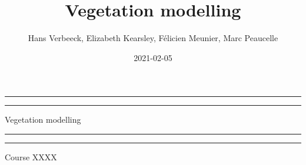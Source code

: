 \documentclass[
  oneside]{book}
\title{Vegetation modelling}
\author{Hans Verbeeck, Elizabeth Kearsley, Félicien Meunier, Marc Peaucelle}
\date{2021-02-05}
\begin{document}
\maketitle

\newcommand{\plogo}{\fbox{$\mathcal{PL}$}} %
\frontmatter


\begin{titlepage} %

	\centering %
	
	\scshape %
	
	\vspace*{\baselineskip} %
	
	
	\vspace{12\baselineskip}
	
	\rule{\textwidth}{1.6pt}\vspace*{-\baselineskip}\vspace*{2pt} %
	\rule{\textwidth}{0.4pt} %
	
	\vspace{0.75\baselineskip} %
	
	{\LARGE Vegetation modelling\\} %
	
	\vspace{0.75\baselineskip} %
	
	\rule{\textwidth}{0.4pt}\vspace*{-\baselineskip}\vspace{3.2pt} %
	\rule{\textwidth}{1.6pt} %
	
	\vspace{2\baselineskip} %
	
	
	Course XXXX %
	
	\vspace*{3\baselineskip} %
	
	

\end{titlepage}
\end{document}
